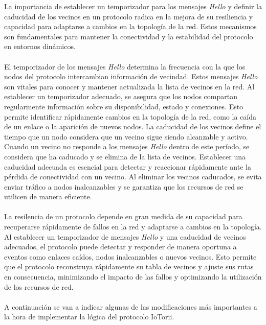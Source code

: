 La importancia de establecer un temporizador para los mensajes \textit{Hello} y definir la caducidad de los vecinos en un protocolo radica en la mejora de su resiliencia y capacidad para adaptarse a cambios en la topología de la red. Estos mecanismos son fundamentales para mantener la conectividad y la estabilidad del protocolo en entornos dinámicos.\\
\\
El temporizador de los mensajes \textit{Hello} determina la frecuencia con la que los nodos del protocolo intercambian información de vecindad. Estos mensajes \textit{Hello} son vitales para conocer y mantener actualizada la lista de vecinos en la red. Al establecer un temporizador adecuado, se asegura que los nodos compartan regularmente información sobre su disponibilidad, estado y conexiones. Esto permite identificar rápidamente cambios en la topología de la red, como la caída de un enlace o la aparición de nuevos nodos. La caducidad de los vecinos define el tiempo que un nodo considera que un vecino sigue siendo alcanzable y activo. Cuando un vecino no responde a los mensajes \textit{Hello} dentro de este período, se considera que ha caducado y se elimina de la lista de vecinos. Establecer una caducidad adecuada es esencial para detectar y reaccionar rápidamente ante la pérdida de conectividad con un vecino. Al eliminar los vecinos caducados, se evita enviar tráfico a nodos inalcanzables y se garantiza que los recursos de red se utilicen de manera eficiente.\\
\\
La resilencia de un protocolo depende en gran medida de su capacidad para recuperarse rápidamente de fallos en la red y adaptarse a cambios en la topología. Al establecer un temporizador de mensajes \textit{Hello} y una caducidad de vecinos adecuados, el protocolo puede detectar y responder de manera oportuna a eventos como enlaces caídos, nodos inalcanzables o nuevos vecinos. Esto permite que el protocolo reconstruya rápidamente su tabla de vecinos y ajuste sus rutas en consecuencia, minimizando el impacto de las fallos y optimizando la utilización de los recursos de red.\\
\\
A continuación se van a indicar algunas de las modificaciones más importantes a la hora de implementar la lógica del protocolo IoTorii.

